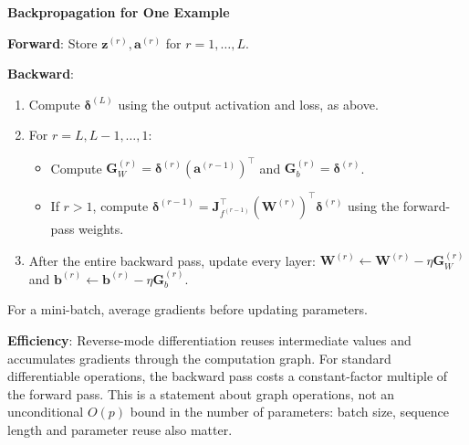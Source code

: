 \documentclass[11pt,twoside]{article}
\numberwithin{equation}{section}
\newcommand{\vect}[1]{\bm{#1}}
\newcommand{\mat}[1]{\bm{#1}}
\theoremstyle{plain}
\theoremstyle{definition}
\theoremstyle{remark}
\newenvironment{keyidea}{
  \begin{tcolorbox}[colback=yellow!5!white,
                    colframe=yellow!50!black,
                    title=Key Idea,
                    breakable,
                    enhanced,
                    sharp corners,
                    boxrule=0.8pt,
                    left=6pt, right=6pt, top=6pt, bottom=6pt]
}{
  \end{tcolorbox}
}
\begin{document}
\begin{algorithmbox}
\textbf{Backpropagation for One Example}

\textbf{Forward}: Store $\vect{z}^{(r)},\vect{a}^{(r)}$ for $r=1,\ldots,L$.

\textbf{Backward}:
\begin{enumerate}
\item Compute $\boldsymbol{\delta}^{(L)}$ using the output activation and loss, as above.
\item For $r=L,L-1,\ldots,1$:
\begin{itemize}
\item Compute $\vect{G}_W^{(r)}=\boldsymbol{\delta}^{(r)}(\vect{a}^{(r-1)})^\top$ and $\vect{G}_b^{(r)}=\boldsymbol{\delta}^{(r)}$.
\item If $r>1$, compute $\boldsymbol{\delta}^{(r-1)}=\mat{J}_{f^{(r-1)}}^\top(\vect{W}^{(r)})^\top\boldsymbol{\delta}^{(r)}$ using the forward-pass weights.
\end{itemize}
\item After the entire backward pass, update every layer: $\vect{W}^{(r)}\leftarrow\vect{W}^{(r)}-\eta\vect{G}_W^{(r)}$ and $\vect{b}^{(r)}\leftarrow\vect{b}^{(r)}-\eta\vect{G}_b^{(r)}$.
\end{enumerate}
For a mini-batch, average gradients before updating parameters.
\end{algorithmbox}

\begin{keyidea}
\textbf{Efficiency}: Reverse-mode differentiation reuses intermediate values and accumulates gradients through the computation graph. For standard differentiable operations, the backward pass costs a constant-factor multiple of the forward pass. This is a statement about graph operations, not an unconditional $O(p)$ bound in the number of parameters: batch size, sequence length and parameter reuse also matter.
\end{keyidea}
\end{document}
